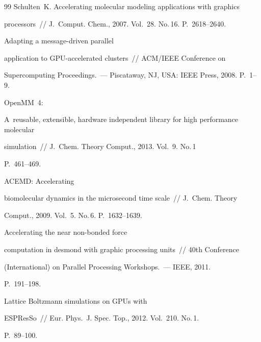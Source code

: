 {{{\begin{thebibliography}{99}
{Schulten~K.} Accelerating molecular modeling applications with graphics 

processors~/\!\!/ J.~Comput. Chem., 2007. Vol.~28. No.\,16. P.~2618--2640.


 Adapting a message-driven parallel 

application to GPU-accelerated clusters~/\!\!/  ACM/IEEE Conference on 

Supercomputing Proceedings.~--- Piscataway, NJ, USA: IEEE Press, 2008. P.~1--9.


 OpenMM~4: 

A~reusable, extensible, hardware independent library for high performance molecular 

simulation~/\!\!/ J.~Chem. Theory Comput., 2013. Vol.~9. No.\,1  

P.~461--469.


 ACEMD: Accelerating 

biomolecular dynamics in the microsecond time scale~/\!\!/ J.~Chem. Theory 

Comput., 2009. Vol.~5. No.\,6. P.~1632--1639.


 Accelerating the near non-bonded force 

computation in desmond with graphic processing units~/\!\!/ 40th Conference 

(International) on Parallel Processing Workshops.~--- IEEE, 2011. 

P.~191--198.


 Lattice Boltzmann simulations on GPUs with 

ESPResSo~/\!\!/  Eur. Phys.~J. Spec. Top., 2012. Vol.~210. No.\,1. 

P.~89--100.


\end{thebibliography}}}}
